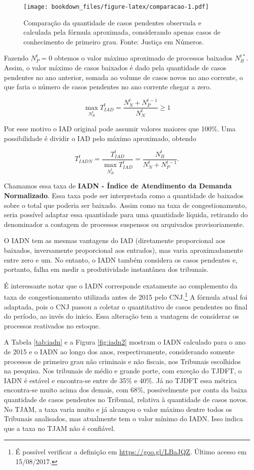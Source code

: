 \documentclass[]{report}
\begin{document}
\begin{figure}[htbp]
\centering
\texttt{[image: bookdown\_files/figure-latex/comparacao-1.pdf]}
\caption{\label{fig:comparacao}Comparação da quantidade de casos pendentes
observada e calculada pela fórmula aproximada, considerando apenas casos
de conhecimento de primeiro grau. Fonte: Justiça em Números.}
\end{figure}

Fazendo \(N_P^t = 0\) obtemos o valor máximo aproximado de processos
baixados \(N_B^{t*}\). Assim, o valor máximo de casos baixados é dado
pela quantidade de casos pendentes no ano anterior, somada ao volume de
casos novos no ano corrente, o que faria o número de casos pendentes no
ano corrente chegar a zero.

\[
\max_{N_B^t}T_{IAD}^t = \frac{N_N^{t} + N_P^{t-1}}{N_N^t} \geq 1
\]

Por esse motivo o IAD original pode assumir valores maiores que 100\%.
Uma possibilidade é dividir o IAD pelo máximo aproximado, obtendo

\[
T_{IADN}^t = \frac{T^t_{IAD}}{\max_{N_B^t}T_{IAD}^t} = \frac{N_B^t}{N_N^t + N_P^{t-1}}.
\]

Chamamos essa taxa de \textbf{IADN - Índice de Atendimento da Demanda
Normalizado}. Essa taxa pode ser interpretada como a quantidade de
baixados sobre o total que poderia ser baixado. Assim como na taxa de
congestionamento, seria possível adaptar essa quantidade para uma
quantidade líquida, retirando do denominador a contagem de processos
suspensos ou arquivados provisoriamente.

O IADN tem as mesmas vantagens do IAD (diretamente proporcional aos
baixados, inversamente proporcional aos entrados), mas varia
aproximadamente entre zero e um. No entanto, o IADN também considera os
casos pendentes e, portanto, falha em medir a produtividade instantânea
dos tribunais.

É interessante notar que o IADN corresponde exatamente ao complemento da
taxa de congestionamento utilizada antes de 2015 pelo CNJ.\footnote{É
  possível verificar a definição em \url{https://goo.gl/LBaJQZ}. Último
  acesso em 15/08/2017.} A fórmula atual foi adaptada, pois o CNJ passou
a coletar o quantitativo de casos pendentes no final do período, ao
invés do inicio. Essa alteração tem a vantagem de considerar os
processos reativados no estoque.

A Tabela \ref{tab:iadn} e a Figura \ref{fig:iadn2} mostram o IADN
calculado para o ano de 2015 e o IADN ao longo dos anos,
respectivamente, considerando somente processos de primeiro grau não
criminais e não fiscais, nos Tribunais escolhidos na pesquisa. Nos
tribunais de médio e grande porte, com exceção do TJDFT, o IADN é
estável e encontra-se entre de 35\% e 40\%. Já no TJDFT essa métrica
encontra-se muito acima dos demais, com 68\%, possivelmente por conta da
baixa quantidade de casos pendentes no Tribunal, relativa à quantidade
de casos novos. No TJAM, a taxa varia muito e já alcançou o valor máximo
dentre todos os Tribunais analisados, mas atualmente tem o valor mínimo
do IADN. Isso indica que a taxa no TJAM não é confiável.
\end{document}

